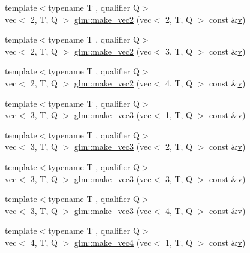 \begin{DoxyCompactItemize}
\item 
{\footnotesize template$<$typename T , qualifier Q$>$ }\\vec$<$ 2, T, Q $>$ \hyperlink{group__gtc__type__ptr_gae54bd325a08ad26edf63929201adebc7}{glm\+::make\+\_\+vec2} (vec$<$ 2, T, Q $>$ const \&\hyperlink{_s_d_l__opengl_8h_a10a82eabcb59d2fcd74acee063775f90}{v})
\item 
{\footnotesize template$<$typename T , qualifier Q$>$ }\\vec$<$ 2, T, Q $>$ \hyperlink{group__gtc__type__ptr_ga0084fea4694cf47276e9cccbe7b1015a}{glm\+::make\+\_\+vec2} (vec$<$ 3, T, Q $>$ const \&\hyperlink{_s_d_l__opengl_8h_a10a82eabcb59d2fcd74acee063775f90}{v})
\item 
{\footnotesize template$<$typename T , qualifier Q$>$ }\\vec$<$ 2, T, Q $>$ \hyperlink{group__gtc__type__ptr_ga2b81f71f3a222fe5bba81e3983751249}{glm\+::make\+\_\+vec2} (vec$<$ 4, T, Q $>$ const \&\hyperlink{_s_d_l__opengl_8h_a10a82eabcb59d2fcd74acee063775f90}{v})
\item 
{\footnotesize template$<$typename T , qualifier Q$>$ }\\vec$<$ 3, T, Q $>$ \hyperlink{group__gtc__type__ptr_ga9147e4b3a5d0f4772edfbfd179d7ea0b}{glm\+::make\+\_\+vec3} (vec$<$ 1, T, Q $>$ const \&\hyperlink{_s_d_l__opengl_8h_a10a82eabcb59d2fcd74acee063775f90}{v})
\item 
{\footnotesize template$<$typename T , qualifier Q$>$ }\\vec$<$ 3, T, Q $>$ \hyperlink{group__gtc__type__ptr_ga482b60a842a5b154d3eed392417a9511}{glm\+::make\+\_\+vec3} (vec$<$ 2, T, Q $>$ const \&\hyperlink{_s_d_l__opengl_8h_a10a82eabcb59d2fcd74acee063775f90}{v})
\item 
{\footnotesize template$<$typename T , qualifier Q$>$ }\\vec$<$ 3, T, Q $>$ \hyperlink{group__gtc__type__ptr_gacd57046034df557b8b1c457f58613623}{glm\+::make\+\_\+vec3} (vec$<$ 3, T, Q $>$ const \&\hyperlink{_s_d_l__opengl_8h_a10a82eabcb59d2fcd74acee063775f90}{v})
\item 
{\footnotesize template$<$typename T , qualifier Q$>$ }\\vec$<$ 3, T, Q $>$ \hyperlink{group__gtc__type__ptr_ga8b589ed7d41a298b516d2a69169248f1}{glm\+::make\+\_\+vec3} (vec$<$ 4, T, Q $>$ const \&\hyperlink{_s_d_l__opengl_8h_a10a82eabcb59d2fcd74acee063775f90}{v})
\item 
{\footnotesize template$<$typename T , qualifier Q$>$ }\\vec$<$ 4, T, Q $>$ \hyperlink{group__gtc__type__ptr_ga600cb97f70c5d50d3a4a145e1cafbf37}{glm\+::make\+\_\+vec4} (vec$<$ 1, T, Q $>$ const \&\hyperlink{_s_d_l__opengl_8h_a10a82eabcb59d2fcd74acee063775f90}{v})

\end{DoxyCompactItemize}
